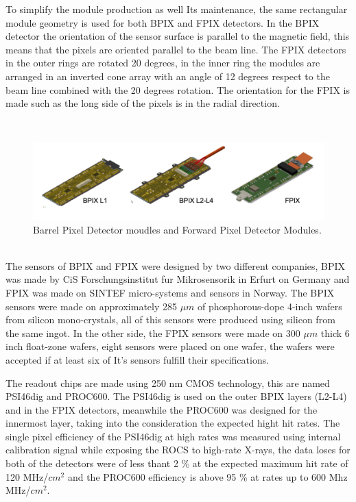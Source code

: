 To simplify the module production as well Its maintenance, the same rectangular module geometry is used for both BPIX and FPIX detectors. In the BPIX detector the orientation of the sensor surface is parallel to the magnetic field, this means that the pixels are oriented parallel to the beam line. The FPIX detectors in the outer rings are rotated 20 degrees, in the inner ring the modules are arranged in an inverted cone array with an angle of 12 degrees respect to the beam line combined with the 20 degrees rotation. The orientation for the FPIX is made such as the long side of the pixels is in the radial direction.  

\\
\begin{figure}[h]
    \centering
    \includegraphics[width=1\textwidth]{BPIXFPIX.png}
    \caption{Barrel Pixel Detector moudles and Forward Pixel Detector Modules.}
    \label{fig:BPIXFPIX}
\end{figure}

\\
The sensors of BPIX and FPIX were designed by two different companies, BPIX was made by CiS Forschungsinstitut fur Mikrosensorik in Erfurt on Germany and FPIX was made on SINTEF micro-systems and sensors in Norway. The BPIX sensors were made on approximately 285 $\mu m$ of phosphorous-dope 4-inch wafers from silicon mono-crystals, all of this sensors were produced using silicon from the same ingot. In the other side, the FPIX sensors were made on 300 $\mu m$ thick 6 inch float-zone wafers, eight sensors were placed on one wafer, the wafers were accepted if at least six of It's sensors fulfill their specifications. 

The readout chips are made using 250 nm CMOS technology, this are named PSI46dig and PROC600. The PSI46dig is used on the outer BPIX layers (L2-L4) and in the FPIX detectors, meanwhile the PROC600 was designed for the innermost layer, taking into the consideration the expected hight hit rates. The single pixel efficiency of the PSI46dig at high rates was measured using internal calibration signal while exposing the ROCS to high-rate X-rays, the data loses for both of the detectors were of less thant 2 \% at the expected maximum hit rate of 120 MHz/$cm^{2}$ and the PROC600 efficiency is above 95 \% at rates up to 600 Mhz MHz/$cm^{2}$.

